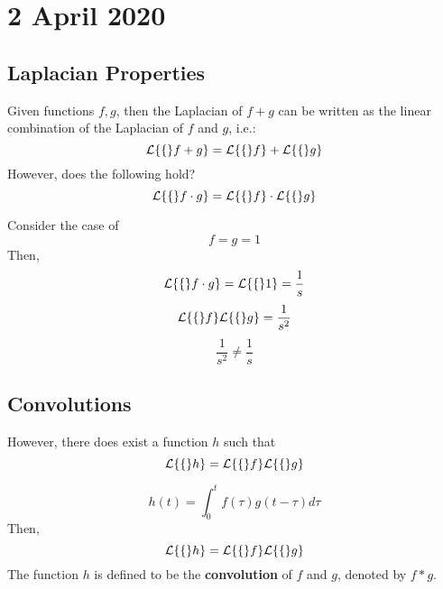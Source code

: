 \documentclass[diffeq.tex]{subfiles}
\begin{document}
\chapter{2 April 2020}
    \section{Laplacian Properties}
    Given functions $f, g$, then the Laplacian of $f + g$ can be written as the linear combination of the Laplacian of $f$ and $g$, i.e.:
    \begin{equation}
        \mathcal{L}\{\{\}f + g\} = \mathcal{L}\{\{\}f\} + \mathcal{L}\{\{\}g\}
    \end{equation}
    However, does the following hold?
    \begin{equation}
        \mathcal{L}\{\{\}f \cdot g\} = \mathcal{L}\{\{\}f\} \cdot \mathcal{L}\{\{\}g\}
    \end{equation}
    \begin{example}
        Consider the case of
        \begin{equation}
            f = g = 1
        \end{equation}
        Then,
        \begin{equation}
            \mathcal{L}\{\{\}f \cdot g\} = \mathcal{L}\{\{\}1\} = \frac{1}{s}
        \end{equation}
        \begin{equation}
            \mathcal{L}\{\{\}f\}\mathcal{L}\{\{\}g\} = \frac{1}{s^{2}}
        \end{equation}
        \begin{equation}
            \frac{1}{s^{2}} \neq \frac{1}{s}
        \end{equation}
    \end{example}
    \np
    \section{Convolutions}
    However, there does exist a function $h$ such that
    \begin{equation}
        \mathcal{L}\{\{\}h\} = \mathcal{L}\{\{\}f\}\mathcal{L}\{\{\}g\}
    \end{equation}
    \begin{btheorem}
        \begin{equation}
            h(t) = \int_{0}^{t}f(\tau)g(t - \tau)d\tau
        \end{equation}
        Then,
        \begin{equation}
            \mathcal{L}\{\{\}h\} = \mathcal{L}\{\{\}f\}\mathcal{L}\{\{\}g\}
        \end{equation}
        The function $h$ is defined to be the \textbf{convolution} of $f$ and $g$, denoted by $f * g$.
    \end{btheorem}
\end{document}
